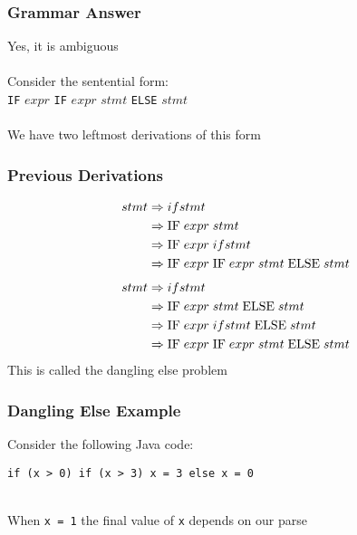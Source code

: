\documentclass[aspectratio=169]{beamer}
\begin{document}
\begin{frame}
\frametitle{Grammar Answer}

Yes, it is ambiguous\\~\\

Consider the \alert{sentential form}:\\
\lstinline{IF} $expr$ \lstinline{IF} $expr$ $stmt$ \lstinline{ELSE}
$stmt$\\~\\

We have two leftmost derivations of this form
\end{frame}

\begin{frame}
\frametitle{Previous Derivations}

\begin{align*}
stmt &\Rightarrow ifstmt\\
     &\Rightarrow \text{\lstinline{IF}} \; expr \; stmt\\
     &\Rightarrow \text{\lstinline{IF}} \; expr \; ifstmt\\
     &\Rightarrow \text{\lstinline{IF}} \; expr \; \text{\lstinline{IF}} \; expr
                  \; stmt \; \text{\lstinline{ELSE}} \; stmt\\
\end{align*}
\begin{align*}
stmt &\Rightarrow ifstmt\\
     &\Rightarrow \text{\lstinline{IF}} \; expr \; stmt \;
                  \text{\lstinline{ELSE}} \; stmt\\
     &\Rightarrow \text{\lstinline{IF}} \; expr \; ifstmt \;
                  \text{\lstinline{ELSE}} \; stmt\\
     &\Rightarrow \text{\lstinline{IF}} \; expr \; \text{\lstinline{IF}} \; expr
                  \; stmt \; \text{\lstinline{ELSE}} \; stmt\\
\end{align*}
This is called the dangling else problem
\end{frame}

\begin{frame}[fragile]
\frametitle{Dangling Else Example}

Consider the following Java code:

\begin{lstlisting}[backgroundcolor=\color{solarizedRebase02}]
if (x > 0) if (x > 3) x = 3 else x = 0
\end{lstlisting}
~\\
When \lstinline{x = 1} the final value of \lstinline{x} depends on our parse
\end{frame}
\end{document}
